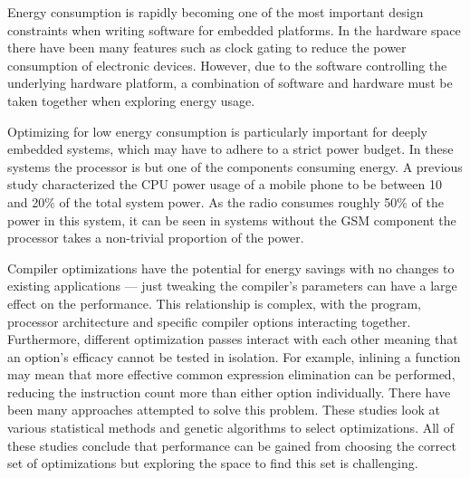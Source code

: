 \documentclass[twocolumn]{article}
\newcommand{\todo}[1]{\textbf{\textcolor{red}{#1}}}
\begin{document}
Energy consumption is rapidly becoming one of the most important design constraints when writing software for embedded platforms. In the hardware space there have been many features such as clock gating to reduce the power consumption of electronic devices. However, due to the software controlling the underlying hardware platform, a combination of software and hardware must be taken together when exploring energy usage.

Optimizing for low energy consumption is particularly important for deeply embedded systems, which may have to adhere to a strict power budget. In these systems the processor is but one of the components consuming energy. A previous study characterized the CPU power usage of a mobile phone to be between 10 and 20\% of the total system power\cite{SmartPhonePower}. As the radio consumes roughly 50\% of the power in this system, it can be seen in systems without the GSM component the processor takes a non-trivial proportion of the power.


Compiler optimizations have the potential for energy savings with no changes to existing applications --- just tweaking the compiler's parameters can have a large effect on the performance. This relationship is complex, with the program, processor architecture and specific compiler options interacting together. Furthermore, different optimization passes interact with each other meaning that an option's efficacy cannot be tested in isolation. For example, inlining a function may mean that more effective common expression elimination can be performed, reducing the instruction count more than either option individually. There have been many approaches attempted to solve this problem\cite{Haneda2005, Lin2008, Triantafyllis}. These studies look at various statistical methods and genetic algorithms to select optimizations. All of these studies conclude that performance can be gained from choosing the correct set of optimizations but exploring the space to find this set is challenging.
\end{document}

